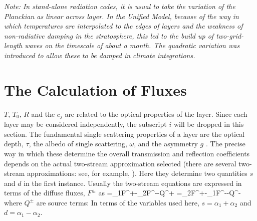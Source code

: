 {\it Note: In stand-alone radiation codes, it is usual to take the
variation of the Planckian as linear across layer. In the Unified Model,
because of the way in which temperatures are interpolated to the
edges of layers and the weakness of non-radiative damping in the
stratosphere, this led to the build up of two-grid-length waves
on the timescale of about a month. The quadratic variation was introduced
to allow these to be damped in climate integrations.}


\section{The Calculation of Fluxes}

$T$, $T_{0}$, $R$ and the  $c_{j}$ are related to the optical 
properties of the layer. Since each layer may be 
considered independently, the subscript $i$ will be dropped  in this 
section. The fundamental single scattering properties 
of a layer are the optical depth, $\tau$, the albedo of single 
scattering, $\omega$, and the asymmetry $g$ . The 
precise way in which these determine the overall transmission and 
reflection coefficients depends on the actual 
two-stream approximation selected (there are several two-stream 
approximations: see, for example, \cite{Zdunkowski80ts}).
Here they determine two quantities $s$  and $d$ in the 
first instance. Usually the two-stream 
equations are expressed in terms of the diffuse fluxes, $F^{\pm}$ as
\beq
{}=\alpha_{1}F^{+}-\alpha_{2}F^{-}-Q^{+}
\label{p2_eq10}
\eeq
\beq
{}=\alpha_{2}F^{+}-\alpha_{1}F^{-}-Q^{-}
\label{p2_eq11}
\eeq
where $Q^{\pm}$ are source terms: In terms of the variables used here, 
$s=\alpha_{1}+\alpha_{2}$ and $d=\alpha_{1}-\alpha_{2}$.

